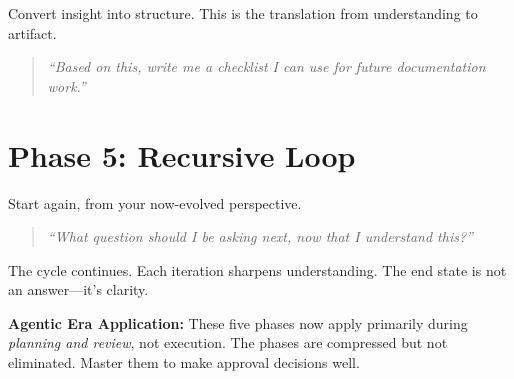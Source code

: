 Convert insight into structure. This is the translation from understanding to artifact.

\begin{quote}
\emph{``Based on this, write me a checklist I can use for future documentation work.''}
\end{quote}

\section{Phase 5: Recursive Loop}

Start again, from your now-evolved perspective.

\begin{quote}
\emph{``What question should I be asking next, now that I understand this?''}
\end{quote}

The cycle continues. Each iteration sharpens understanding. The end state is not an answer---it's clarity.

\begin{quotebox}
\textbf{Agentic Era Application:} These five phases now apply primarily during \emph{planning and review}, not execution. The phases are compressed but not eliminated. Master them to make approval decisions well.
\end{quotebox}
